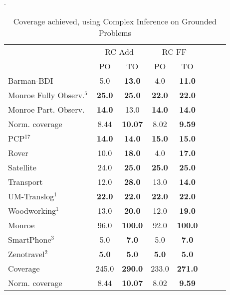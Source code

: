 \documentclass[letterpaper]{article} %
\begin{document}
\begin{table}
	\centering
	\caption{Coverage achieved, using Complex Inference on Grounded Problems}
	\label{table:GroundedComplexCoverage}.
	\scalebox{0.8} {

\begin{tabular}{lccccccl} 
	\toprule 
	&  \multicolumn{2}{c}{RC Add} & \multicolumn{2}{c}{ RC FF} \\ %
	\cmidrule(lr){2-3} \cmidrule(lr){4-5}  
	&PO & TO &PO & TO  \\ 
	\midrule 
	Barman-BDI & 5.0 & \textbf{13.0} & 4.0 & \textbf{11.0}  \\ 
	Monroe Fully Observ.$^{5}$ & \textbf{25.0} & \textbf{25.0} & \textbf{22.0} & \textbf{22.0}  \\ 
	Monroe Part. Observ. & \textbf{14.0} & 13.0 & \textbf{14.0} & \textbf{14.0}  \\ 
	Norm. coverage & 8.44 & \textbf{10.07} & 8.02 & \textbf{9.59}  \\ 
	PCP$^{17}$ & \textbf{14.0} & \textbf{14.0} & \textbf{15.0} & \textbf{15.0}  \\ 
	Rover & 10.0 & \textbf{18.0} & 4.0 & \textbf{17.0}  \\ 
	Satellite & 24.0 & \textbf{25.0} & \textbf{25.0} & \textbf{25.0}  \\ 
	Transport & 12.0 & \textbf{28.0} & 13.0 & \textbf{14.0}  \\ 
	UM-Translog$^{1}$ & \textbf{22.0} & \textbf{22.0} & \textbf{22.0} & \textbf{22.0}  \\ 
	Woodworking$^{1}$ & 13.0 & \textbf{20.0} & 12.0 & \textbf{19.0}  \\ 
	
	\midrule 
	Monroe & 96.0 & \textbf{100.0} & 92.0 & \textbf{100.0}  \\ 
	SmartPhone$^{3}$ & 5.0 & \textbf{7.0} & 5.0 & \textbf{7.0}  \\ 
	Zenotravel$^{2}$ & \textbf{5.0} & \textbf{5.0} & \textbf{5.0} & \textbf{5.0}  \\ 
	
		\midrule 
	Coverage & 245.0 & \textbf{290.0} & 233.0 & \textbf{271.0}  \\ 
	Norm. coverage & 8.44 & \textbf{10.07} & 8.02 & \textbf{9.59}  \\ 
	\bottomrule 
\end{tabular} 
	}
\end{table}
\end{document}

